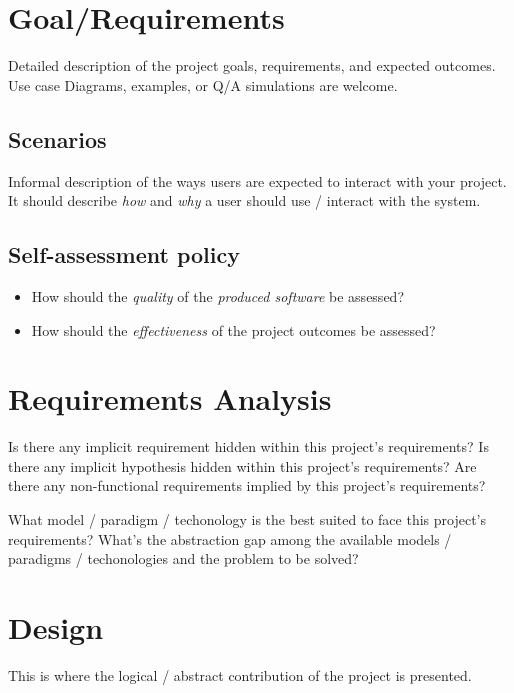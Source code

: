 \documentclass{scrartcl}
\begin{document}
\section{Goal/Requirements}

Detailed description of the project goals, requirements, and expected outcomes.
%
Use case Diagrams, examples, or Q/A simulations are welcome.

\subsection{Scenarios}

Informal description of the ways users are expected to interact with your project.
%
It should describe \emph{how} and \emph{why} a user should use / interact with the system.

\subsection{Self-assessment policy}

\begin{itemize}
    \item How should the \emph{quality} of the \emph{produced software} be assessed?

    \item How should the \emph{effectiveness} of the project outcomes be assessed?
\end{itemize}

\section{Requirements Analysis}

Is there any implicit requirement hidden within this project's requirements?
%
Is there any implicit hypothesis hidden within this project's requirements?
%
Are there any non-functional requirements implied by this project's requirements?

What model / paradigm / techonology is the best suited to face this project's requirements?
%
What's the abstraction gap among the available models / paradigms / techonologies and the problem to be solved?

\section{Design}

This is where the logical / abstract contribution of the project is presented.
\end{document}
